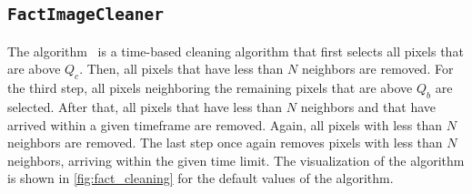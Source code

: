 \subsection*{\texttt{FactImageCleaner}}%
\vspace{-0.5cm}
The \fact{} algorithm~\cite{temme_thesis, temme_diploma} is a time-based cleaning algorithm that first selects all pixels that are above
\(Q_c\). Then, all pixels that have less than \(N\) neighbors are removed.
For the third step, all pixels neighboring
the remaining pixels that are above \(Q_b\) are selected. After that, all
pixels that have less than \(N\) neighbors and that have arrived within a given timeframe are removed.
Again, all pixels with less than \(N\) neighbors are removed. The last step once again removes pixels with less than
\(N\) neighbors, arriving within the given time limit. The visualization of the algorithm is shown in
\autoref{fig:fact_cleaning} for the default values of the algorithm.
\vspace{-0.75cm}
